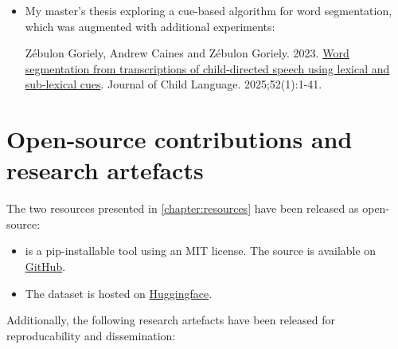 \begin{itemize}
\item My master's thesis exploring a cue-based algorithm for word segmentation, which was augmented with additional experiments:
\begin{mdframed}[linewidth=1pt]
    Zébulon Goriely, Andrew Caines and Zébulon Goriely. 2023. \href{https://www.cambridge.org/core/journals/journal-of-child-language/article/word-segmentation-from-transcriptions-of-childdirected-speech-using-lexical-and-sublexical-cues/5D206536C878ADA80026ED8E2E72F848}{Word segmentation from transcriptions of child-directed speech using lexical and sub-lexical cues}. Journal of Child Language. 2025;52(1):1-41.
\end{mdframed}
\end{itemize}

\section{Open-source contributions and research artefacts}

The two resources presented in \cref{chapter:resources} have been released as open-source:

\begin{itemize}
\item \gpp is a pip-installable tool using an MIT license. The source is available on \href{https://github.com/codebyzeb/g2p-plus}{GitHub}. 
\item The \ipachildes dataset is hosted on \href{https://huggingface.co/datasets/phonemetransformers/IPA-CHILDES}{Huggingface}.
\end{itemize}

Additionally, the following research artefacts have been released for reproducability and dissemination:

